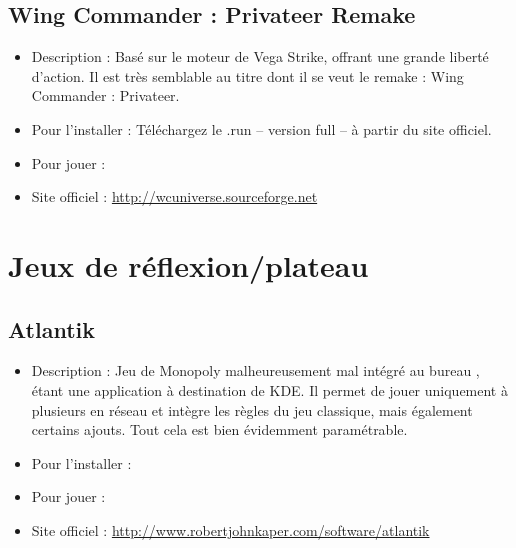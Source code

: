 \subsection{Wing Commander : Privateer Remake}
\begin{itemize}
\begingroup
{}
\item Description : Basé sur le moteur de Vega Strike, offrant une grande liberté d'action. Il est très semblable au titre dont il se veut le remake : Wing Commander : Privateer.{\par}
\item Pour l'installer : Téléchargez le .run -- version full -- à partir du site officiel.{\par}
\item Pour jouer : 
\item Site officiel : \url{http://wcuniverse.sourceforge.net}{\par}
\endgroup
\end{itemize}
\section{Jeux de réflexion/plateau}
\subsection{Atlantik}
\begin{itemize}
\begingroup
{}
\item Description : Jeu de Monopoly malheureusement mal intégré au bureau , étant une application à destination de KDE. Il permet de jouer uniquement à plusieurs en réseau et intègre les règles du jeu classique, mais également certains ajouts. Tout cela est bien évidemment paramétrable.{\par}
\endgroup
\item Pour l'installer : 
\item Pour jouer : 
\item Site officiel : \url{http://www.robertjohnkaper.com/software/atlantik}{\par}
\end{itemize}
